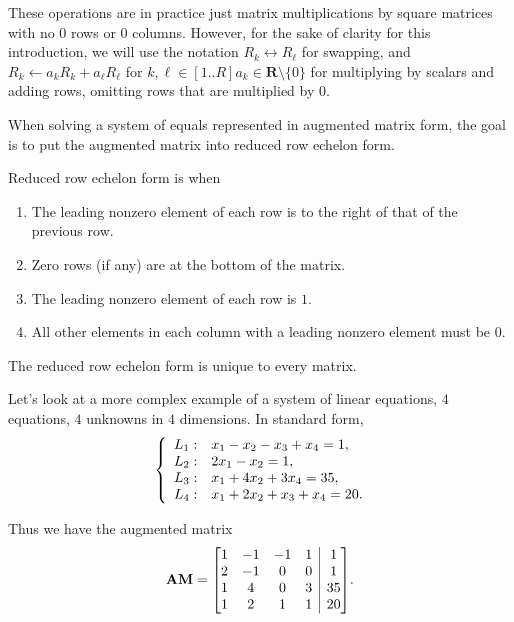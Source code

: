 \documentclass{article}
\begin{document}
These operations are in practice just matrix multiplications by square matrices with no $0$ rows or $0$ columns. However, for the sake of clarity for this introduction, we will use the notation $R_k \leftrightarrow R_\ell$ for swapping, and $R_k \gets a_k R_k + a_\ell R_\ell$ for $k,\ell \in [1..R] a_k \in \mathbf{R}\setminus\{0\}$ for multiplying by scalars and adding rows, omitting rows that are multiplied by 0.

When solving a system of equals represented in augmented matrix form, the goal is to put the augmented matrix into reduced row echelon form.

Reduced row echelon form is when
\begin{enumerate}
    \item The leading nonzero element of each row is to the right of that of the previous row.
    \item Zero rows (if any) are at the bottom of the matrix.
    \item The leading nonzero element of each row is $1$.
    \item All other elements in each column with a leading nonzero element must be $0$.
\end{enumerate}
The reduced row echelon form is unique to every matrix.

Let's look at a more complex example of a system of linear equations, $4$ equations, $4$ unknowns in $4$ dimensions. In standard form,
\begin{equation}\label{eq:4d linear system to solve}
    \left\{
        \begin{array}{ll@{}}
            L_1: & x_1 - x_2 - x_3 + x_4 = 1, \\*
            L_2: & 2x_1 - x_2 = 1, \\*
            L_3: & x_1 + 4x_2 + 3x_4 = 35, \\*
            L_4: & x_1 + 2x_2 + x_3 + x_4 = 20. \\*
        \end{array}
    \right.
\end{equation}

Thus we have the augmented matrix
\begin{equation}
        \mathbf{AM}
        = \left[
            \begin{array}{@{}*4c|c@{}}
                1 & -1 & -1 & 1 &  1 \\*
                2 & -1 &  0 & 0 &  1 \\*
                1 &  4 &  0 & 3 & 35 \\*
                1 &  2 &  1 & 1 & 20 \\*
            \end{array}
        \right]\!.
\end{equation}
\end{document}
